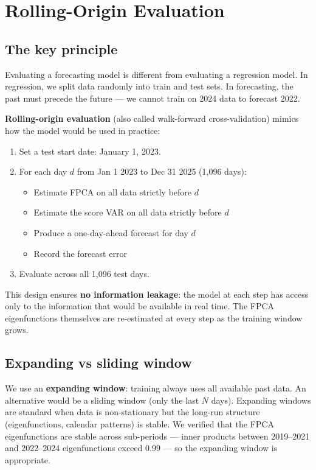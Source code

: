 \documentclass[11pt,a4paper]{article}
\begin{document}
\section{Rolling-Origin Evaluation}

\subsection{The key principle}

Evaluating a forecasting model is different from evaluating a
regression model. In regression, we split data randomly into train
and test sets. In forecasting, the past must precede the future ---
we cannot train on 2024 data to forecast 2022.

\textbf{Rolling-origin evaluation} (also called walk-forward
cross-validation) mimics how the model would be used in practice:

\begin{enumerate}[nosep]
  \item Set a test start date: January 1, 2023.
  \item For each day $d$ from Jan 1 2023 to Dec 31 2025 (1,096 days):
    \begin{itemize}[nosep]
      \item Estimate FPCA on all data strictly before $d$
      \item Estimate the score VAR on all data strictly before $d$
      \item Produce a one-day-ahead forecast for day $d$
      \item Record the forecast error
    \end{itemize}
  \item Evaluate across all 1,096 test days.
\end{enumerate}

This design ensures \textbf{no information leakage}: the model at each
step has access only to the information that would be available in real
time. The FPCA eigenfunctions themselves are re-estimated at every step
as the training window grows.

\subsection{Expanding vs sliding window}

We use an \textbf{expanding window}: training always uses all available
past data. An alternative would be a sliding window (only the last $N$
days). Expanding windows are standard when data is non-stationary but
the long-run structure (eigenfunctions, calendar patterns) is stable.
We verified that the FPCA eigenfunctions are stable across sub-periods
--- inner products between 2019--2021 and 2022--2024 eigenfunctions
exceed 0.99 --- so the expanding window is appropriate.
\end{document}
